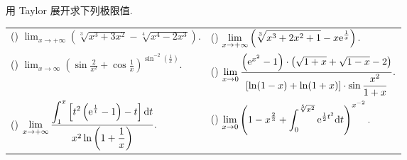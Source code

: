 \begin{example}
    用 Taylor 展开求下列极限值.
    \setcounter{magicrownumbers}{0}
    \begin{table}[H]
        \centering
        \begin{tabular}{l | l}
            (\rownumber{}) $\displaystyle\lim_{x\to+\infty}\left(\sqrt[3]{x^3+3x^2}-\sqrt[4]{x^4-2x^3}\right).$                                                                         & (\rownumber{}) $\displaystyle\lim_{x\to+\infty}\left(\sqrt[3]{x^3+2x^2+1}-x\mathrm{e} ^{\frac{1}{x}}\right).$                                                             \\
            (\rownumber{}) $\displaystyle\lim_{x\to\infty}\left(\sin\frac{2}{x^2}+\cos\frac{1}{x}\right)^{\sin^{-2}\left(\frac{1}{x}\right)}.$                                          & (\rownumber{}) $\displaystyle\lim_{x\to0}\frac{\left(\mathrm{e} ^{x^2}-1\right)\cdot\left(\sqrt{1+x}+\sqrt{1-x}-2\right)}{[\ln(1-x)+\ln(1+x)]\cdot\sin\dfrac{x^2}{1+x}}.$ \\
            (\rownumber{}) $\displaystyle\lim_{x\to+\infty}\frac{\displaystyle\int_{1}^{x}\left[t^2\left(\mathrm{e} ^{\frac{1}{t}}-1\right)-t\right]\dd t}{x^2\ln\left(1+\dfrac{1}{x}\right)}.$ & (\rownumber{}) $\displaystyle\lim _{x\to 0}\left( 1-x^{\frac{2}{3}}+\int _{0}^{\sqrt[5] {x^{2}}}\mathrm{e} ^{\frac{1}{2}t^{2}}\dd t\right) ^{x^{-2}}.$
        \end{tabular}
    \end{table}
\end{example}
